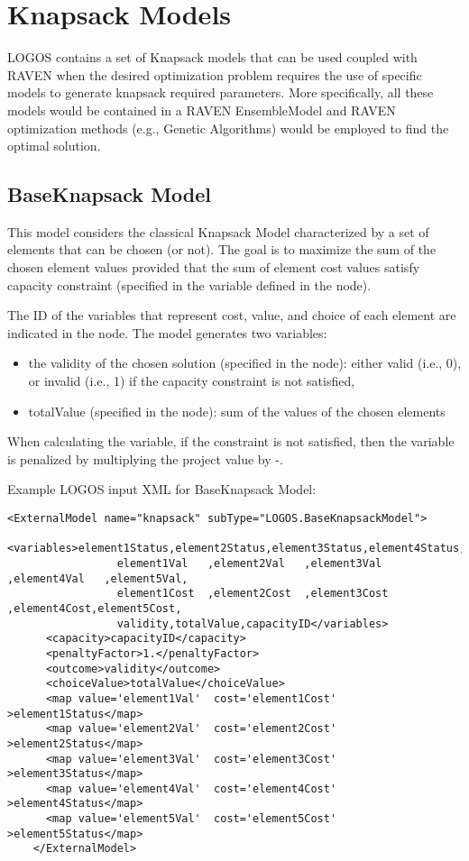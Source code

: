 \section{Knapsack Models}
\label{sec:KnapsackModels}

LOGOS contains a set of Knapsack models that can be used coupled with RAVEN when 
the desired optimization problem requires the use of specific models to generate
knapsack required parameters.
More specifically, all these models would be contained in a RAVEN EnsembleModel 
and RAVEN optimization methods (e.g., Genetic Algorithms) would be employed to 
find the optimal solution.


\subsection{BaseKnapsack Model}
\label{subsec:BaseKnapsackModel}
This model considers the classical Knapsack Model characterized by a set of elements 
that can be chosen (or not).
The goal is to maximize the sum of the chosen element values provided that the sum of 
element cost values satisfy capacity constraint (specified in the variable defined 
in the  node).

The ID of the variables that represent cost, value, and choice of each element are 
indicated in the  node.
The model generates two variables:
\begin{itemize}
  \item the validity of the chosen solution (specified in the  node): either 
        valid (i.e., 0), or invalid (i.e., 1) if the capacity constraint is not satisfied,
  \item totalValue (specified in the  node): sum of the values of the 
        chosen elements
\end{itemize}

When calculating the  variable, if the  constraint 
is not satisfied, then the  variable is penalized by multiplying the 
project value by -.

Example LOGOS input XML for BaseKnapsack Model:
\begin{lstlisting}[style=XML]
    <ExternalModel name="knapsack" subType="LOGOS.BaseKnapsackModel">
      <variables>element1Status,element2Status,element3Status,element4Status,element5Status,
                 element1Val   ,element2Val   ,element3Val   ,element4Val   ,element5Val,
                 element1Cost  ,element2Cost  ,element3Cost  ,element4Cost,element5Cost,
                 validity,totalValue,capacityID</variables>
      <capacity>capacityID</capacity>
      <penaltyFactor>1.</penaltyFactor>
      <outcome>validity</outcome>
      <choiceValue>totalValue</choiceValue>
      <map value='element1Val'  cost='element1Cost' >element1Status</map>
      <map value='element2Val'  cost='element2Cost' >element2Status</map>
      <map value='element3Val'  cost='element3Cost' >element3Status</map>
      <map value='element4Val'  cost='element4Cost' >element4Status</map>
      <map value='element5Val'  cost='element5Cost' >element5Status</map>
    </ExternalModel>
\end{lstlisting}



